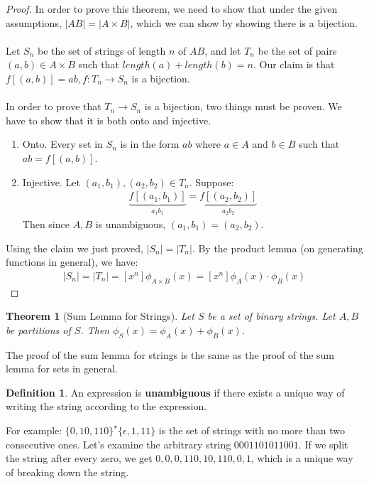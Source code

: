\documentclass[]{article}
\newtheorem*{theorem}{Theorem}
\theoremstyle{definition}
\newtheorem*{defn}{Definition}
\begin{document}
			\begin{proof}
				In order to prove this theorem, we need to show that under the given assumptions, $|AB| = |A \times B|$, which we can show by showing there is a bijection.
				\\ \\
				Let $S_n$ be the set of strings of length $n$ of $AB$, and let $T_n$ be the set of pairs $(a, b) \in A \times B$ such that $length(a) + length(b) = n$. Our claim is that $f[(a, b)] = ab, f : T_n \to S_n$ is a bijection. 
				\\ \\
				In order to prove that $T_n \to S_n$ is a bijection, two things must be proven. We have to show that it is both onto and injective.
				\begin{enumerate}
					\item Onto. Every set in $S_n$ is in the form $ab$ where $a \in A$ and $b \in B$ such that $ab = f[(a, b)]$.
					\item Injective. Let $(a_1, b_1), (a_2, b_2) \in T_n$. Suppose:
						\begin{align*}
							\underbrace{f[(a_1, b_1)]}_{a_1b_1} = \underbrace{f[(a_2, b_2)]}_{a_2b_2}
						\end{align*}
						Then since $A,B$ is unambiguous, $(a_1, b_1) = (a_2, b_2)$.
				\end{enumerate}

				Using the claim we just proved, $|S_n| = |T_n|$. By the product lemma (on generating functions in general), we have:
				\begin{align*}
					|S_n| = |T_n| = [x^n] \phi_{A \times B}(x) = [x^n] \phi_A(x) \cdot \phi_B(x)
				\end{align*}
			\end{proof}

			\begin{theorem}[Sum Lemma for Strings]
				Let $S$ be a set of binary strings. Let $A, B$ be partitions of $S$. Then $\phi_S(x) = \phi_A(x) + \phi_B(x)$.
			\end{theorem}

			The proof of the sum lemma for strings is the same as the proof of the sum lemma for sets in general.

			\begin{defn}
				An expression is \textbf{unambiguous} if there exists a unique way of writing the string according to the expression.
			\end{defn}

			For example: $\{0, 10, 110\}^\star \{\epsilon, 1, 11\}$ is the set of strings with no more than two consecutive ones. Let's examine the arbitrary string $0001101011001$. If we split the string after every zero, we get $0,0,0,110,10,110,0,1$, which is a unique way of breaking down the string.
\end{document}
